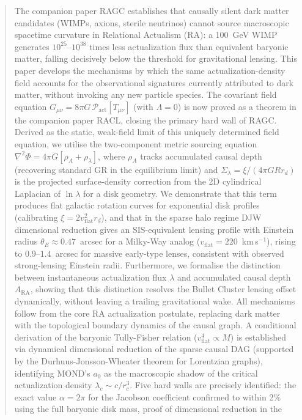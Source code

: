 \documentclass[11pt,a4paper]{article}
\theoremstyle{plain}
\theoremstyle{definition}
\theoremstyle{remark}
\begin{document}
\begin{abstract}
The companion paper RAGC establishes that causally silent
dark matter candidates (WIMPs, axions, sterile neutrinos) cannot source macroscopic
spacetime curvature in Relational Actualism (RA): a 100~GeV WIMP generates
$10^{25}$--$10^{38}$ times less actualization flux than equivalent baryonic matter,
falling decisively below the threshold for gravitational lensing. This paper
develops the mechanisms by which the same actualization-density field accounts for
the observational signatures currently attributed to dark matter, without invoking
any new particle species. The covariant field equation
$G_{\mu\nu} = 8\pi G\,\mathcal{P}_{\mathrm{act}}[T_{\mu\nu}]$ (with $\Lambda=0$)
is now proved as a theorem in the companion paper
RACL, closing the primary hard wall of
RAGC. Derived as the static, weak-field limit of this
uniquely determined field equation, we utilise the
two-component metric sourcing equation $\nabla^2\Phi = 4\pi G[\rho_A + \rho_\lambda]$,
where $\rho_A$ tracks accumulated causal depth (recovering standard GR in the
equilibrium limit) and $\Sigma_\lambda = \xi/(4\pi G R r_d)$ is the projected
surface-density correction from the 2D cylindrical Laplacian of $\ln\lambda$
for a disk geometry. We demonstrate that this term produces flat galactic rotation
curves for exponential disk profiles (calibrating $\xi = 2v_{\mathrm{flat}}^2 r_d$),
and that in the sparse halo regime DJW dimensional reduction gives an SIS-equivalent
lensing profile with Einstein radius $\theta_E \approx 0.47$~arcsec for a Milky-Way
analog ($v_{\mathrm{flat}} = 220$~km\,s$^{-1}$), rising to $0.9$--$1.4$~arcsec for
massive early-type lenses, consistent with observed strong-lensing Einstein radii. Furthermore, we formalise the distinction between
instantaneous actualization flux $\lambda$ and accumulated causal depth
$A_{\mathrm{RA}}$, showing that this distinction resolves the Bullet Cluster
lensing offset dynamically, without leaving a trailing gravitational wake. All
mechanisms follow from the core RA actualization postulate, replacing dark matter
with the topological boundary dynamics of the causal graph. A conditional
derivation of the baryonic Tully-Fisher relation ($v_{\mathrm{flat}}^4 \propto M$)
is established via dynamical dimensional reduction of the sparse causal DAG
(supported by the Durhuus-Jonsson-Wheater theorem for Lorentzian graphs),
identifying MOND's $a_0$ as the macroscopic shadow of the critical actualization
density $\lambda_c \sim c/r_c^3$. Five hard walls are precisely identified:
the exact value $\alpha = 2\pi$ for the Jacobson coefficient confirmed to within 2\% using the full baryonic disk mass, proof of dimensional reduction in the

\end{abstract}
\end{document}
